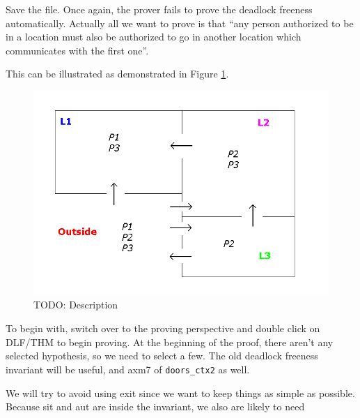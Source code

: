 Save the file. Once again, the prover fails to prove the deadlock freeness automatically. Actually all we want to prove is that ``any person authorized to be in a location must also be authorized to go in another location which communicates with the first one''.

This can be illustrated as demonstrated in Figure \ref{fig_tut_10_graph}.

\begin{figure}[!ht]
\begin{center}
	\includegraphics[]{img/tutorial/tut_10_graph.png}
	\caption{TODO: Description}
	\label{fig_tut_10_graph}
\end{center}
\end{figure}

To begin with, switch over to the proving perspective and double click on \textsf{DLF/THM} to begin proving. At the beginning of the proof, there aren't any selected hypothesis, so we need to select a few. The old deadlock freeness invariant will be useful, and \textsf{axm7} of \texttt{doors\_ctx2} as well. 

\begin{description}
\AXIOMS
	\begin{description}
	\end{description}
\end{description}

We will try to avoid using \textsf{exit} since we want to keep things as simple as possible. Because \textsf{sit} and \textsf{aut} are inside the invariant, we also are likely to need 

